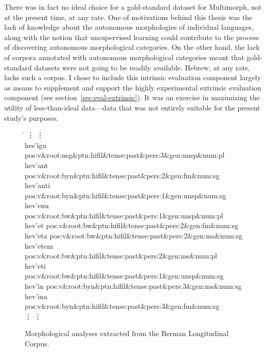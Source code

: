 There was in fact no ideal choice for a gold-standard dataset for Multimorph, 
not at the present time, at any rate. One of motivations behind this 
thesis was the lack of knowledge about the autonomous morphologies 
of individual languages, along with the notion that unsupervised learning could contribute to the 
process of discovering autonomous morphological categories. On the other hand, the lack
of corpora annotated with autonomous morphological categories meant 
that gold-standard datasets were not going to be readily available. Hebrew, at any rate,
lacks such a corpus. 
I chose to include this intrinsic evaluation component largely as means 
to supplement and support the highly experimental extrinsic evaluation 
component (see section~\ref{sec:eval-extrinsic}).  It was an exercise in maximizing the utility of less-than-ideal 
data---data that was not entirely
suitable for the present study's purposes.

\begin{figure}[t]
\begin{mdframed}
\begin{tabbing}
\hspace{1in} \= \hspace{5.5in} \kill
\vdots \> \vdots \\
hes\a'{i}gu \> pos:v\&root:nsg\&ptn:hifil\&tense:past\&pers:3\&gen:unsp\&num:pl \\
hev\a'{a}nt \> pos:v\&root:byn\&ptn:hifil\&tense:past\&pers:2\&gen:fm\&num:sg \\
hev\a'{a}nti \> pos:v\&root:byn\&ptn:hifil\&tense:past\&pers:1\&gen:unsp\&num:sg \\
hev\a'{e}nu \> pos:v\&root:bw\&ptn:hifil\&tense:past\&pers:1\&gen:unsp\&num:pl \\
hev\a'{e}t \> pos:v\&root:bw\&ptn:hifil\&tense:past\&pers:2\&gen:fm\&num:sg \\
hev\a'{e}ta \> pos:v\&root:bw\&ptn:hifil\&tense:past\&pers:2\&gen:ms\&num:sg \\
hev\a'{e}tem \> pos:v\&root:bw\&ptn:hifil\&tense:past\&pers:2\&gen:ms\&num:pl \\
hev\a'{e}ti \> pos:v\&root:bw\&ptn:hifil\&tense:past\&pers:1\&gen:unsp\&num:sg \\
hev\a'{i}n \> pos:v\&root:byn\&ptn:hifil\&tense:past\&pers:3\&gen:ms\&num:sg \\
hev\a'{i}na \> pos:v\&root:byn\&ptn:hifil\&tense:past\&pers:3\&gen:fm\&num:sg \\
\vdots \> \vdots \\
\end{tabbing}
\caption{Morphological analyses extracted from the Berman Longitudinal Corpus.}
\label{fig:verb-analyses}
\end{mdframed}
\end{figure}

